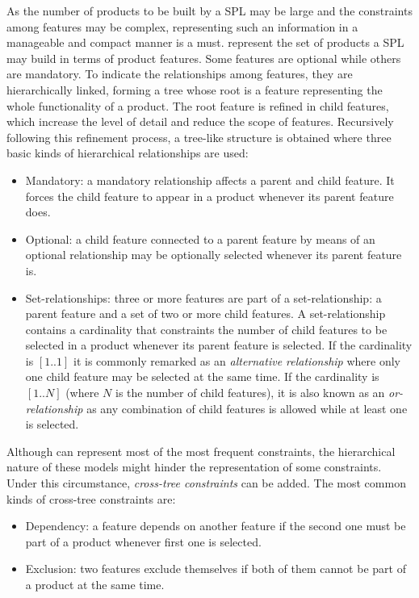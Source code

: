 As the number of products to be built by a SPL may be large and the constraints among features may be complex, representing such an information in a manageable and compact manner is a must. \fms represent the set of products a SPL may build in terms of product features. Some features are optional while others are mandatory. To indicate the relationships among features, they are hierarchically linked, forming a tree whose root is a feature representing the whole functionality of a product. The root feature is refined in child features, which increase the level of detail and reduce the scope of features. Recursively following this refinement process, a tree-like structure is obtained where three basic kinds of hierarchical relationships are used:
\begin{itemize}
\item Mandatory: a mandatory relationship affects a parent and child feature. It forces the child feature to appear in a product whenever its parent feature does. 
\item Optional: a child feature connected to a parent feature by means of an optional relationship may be optionally selected whenever its parent feature is.
\item Set-relationships: three or more features are part of a set-relationship: a parent feature and a set of two or more child features. A set-relationship contains a cardinality that constraints the number of child features to be selected in a product whenever its parent feature is selected. If the cardinality is $[1..1]$ it is commonly remarked as an \emph{alternative relationship} where only one child feature may be selected at the same time. If the cardinality is $[1..N]$ (where $N$ is the number of child features), it is also known as an \emph{or-relationship} as any combination of child features is allowed while at least one is selected.
\end{itemize}

Although \fms can represent most of the most frequent constraints, the hierarchical nature of these models might hinder the representation of some constraints. Under this circumstance, \emph{cross-tree constraints} can be added. The most common kinds of cross-tree constraints are:
\begin{itemize}
\item Dependency: a feature depends on another feature if the second one must be part of a product whenever first one is selected.
\item Exclusion: two features exclude themselves if both of them cannot be part of a product at the same time.
\end{itemize}

